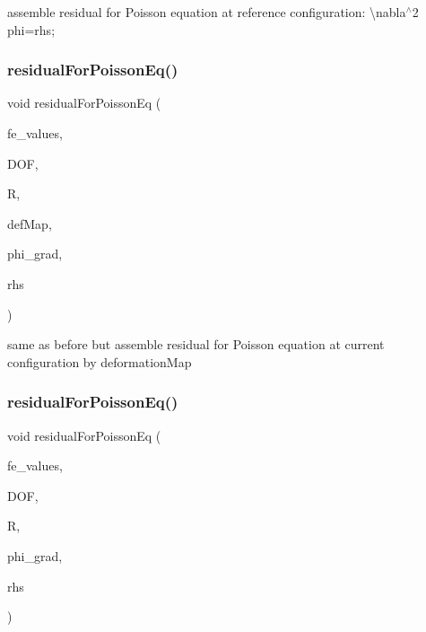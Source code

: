 assemble residual for Poisson equation at reference configuration\+: \textbackslash{}nabla$^\wedge$2 phi=rhs; \mbox{\label{class_residual_ad457db9bcfe7ff4d134642440cd1c4e6}} 
\subsubsection{\texorpdfstring{residualForPoissonEq()}{residualForPoissonEq()}\hspace{0.1cm}{\footnotesize\ttfamily [2/4]}}
{\footnotesize\ttfamily void residual\+For\+Poisson\+Eq (\begin{DoxyParamCaption}\item[{const F\+E\+Values$<$ dim $>$ \&}]{fe\+\_\+values,  }\item[{unsigned int}]{D\+OF,  }\item[{dealii\+::\+Table$<$ 1, T $>$ \&}]{R,  }\item[{\mbox{\hyperlink{structdeformation_map}{deformation\+Map}}$<$ T, dim $>$ \&}]{def\+Map,  }\item[{dealii\+::\+Table$<$ 2, T $>$ \&}]{phi\+\_\+grad,  }\item[{dealii\+::\+Table$<$ 1, T $>$ \&}]{rhs }\end{DoxyParamCaption})}

same as before but assemble residual for Poisson equation at current configuration by deformation\+Map \mbox{\label{class_residual_ad1d5fc375c6f93d9aad89fc1cf9fd25f}} 
\subsubsection{\texorpdfstring{residualForPoissonEq()}{residualForPoissonEq()}\hspace{0.1cm}{\footnotesize\ttfamily [3/4]}}
{\footnotesize\ttfamily void residual\+For\+Poisson\+Eq (\begin{DoxyParamCaption}\item[{const F\+E\+Values$<$ dim $>$ \&}]{fe\+\_\+values,  }\item[{unsigned int}]{D\+OF,  }\item[{dealii\+::\+Table$<$ 1, T $>$ \&}]{R,  }\item[{dealii\+::\+Table$<$ 3, T $>$ \&}]{phi\+\_\+grad,  }\item[{dealii\+::\+Table$<$ 2, T $>$ \&}]{rhs }\end{DoxyParamCaption})}

